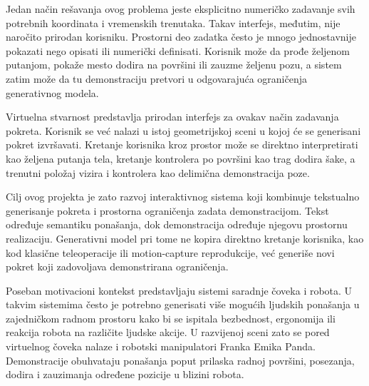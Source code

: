 \documentclass{article}
\begin{document}
Jedan način rešavanja ovog problema jeste eksplicitno numeričko zadavanje svih potrebnih koordinata i vremenskih trenutaka. Takav interfejs, međutim, nije naročito prirodan korisniku. Prostorni deo zadatka često je mnogo jednostavnije pokazati nego opisati ili numerički definisati. Korisnik može da prođe željenom putanjom, pokaže mesto dodira na površini ili zauzme željenu pozu, a sistem zatim može da tu demonstraciju pretvori u odgovarajuća ograničenja generativnog modela.

Virtuelna stvarnost predstavlja prirodan interfejs za ovakav način zadavanja pokreta. Korisnik se već nalazi u istoj geometrijskoj sceni u kojoj će se generisani pokret izvršavati. Kretanje korisnika kroz prostor može se direktno interpretirati kao željena putanja tela, kretanje kontrolera po površini kao trag dodira šake, a trenutni položaj vizira i kontrolera kao delimična demonstracija poze.

Cilj ovog projekta je zato razvoj interaktivnog sistema koji kombinuje tekstualno generisanje pokreta i prostorna ograničenja zadata demonstracijom. Tekst određuje semantiku ponašanja, dok demonstracija određuje njegovu prostornu realizaciju. Generativni model pri tome ne kopira direktno kretanje korisnika, kao kod klasične teleoperacije ili motion-capture reprodukcije, već generiše novi pokret koji zadovoljava demonstrirana ograničenja.

Poseban motivacioni kontekst predstavljaju sistemi saradnje čoveka i robota. U takvim sistemima često je potrebno generisati više mogućih ljudskih ponašanja u zajedničkom radnom prostoru kako bi se ispitala bezbednost, ergonomija ili reakcija robota na različite ljudske akcije. U razvijenoj sceni zato se pored virtuelnog čoveka nalaze i robotski manipulatori Franka Emika Panda. Demonstracije obuhvataju ponašanja poput prilaska radnoj površini, posezanja, dodira i zauzimanja određene pozicije u blizini robota.
\end{document}
